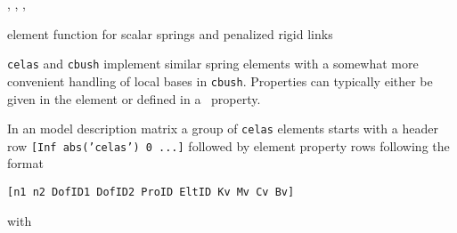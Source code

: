 
\noindent \pbeam, \melastic, \femk, \feplot 


\noindent element function for scalar springs and penalized rigid links


{\tt celas} and {\tt cbush} implement similar spring elements with a somewhat more convenient handling of local bases in {\tt cbush}. Properties can typically either be given in the element or defined in a \pspring\ property. 


\noindent In an model description matrix a group of {\tt celas} elements starts with a header row {\tt [Inf  abs('celas') 0 ...]} followed by element property rows following the format

{\tt [n1 n2 DofID1 DofID2 ProID EltID Kv Mv Cv Bv]}

with

